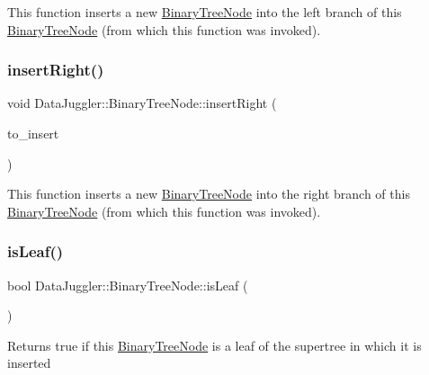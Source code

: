 This function inserts a new \hyperlink{classDataJuggler_1_1BinaryTreeNode}{Binary\+Tree\+Node} into the left branch of this \hyperlink{classDataJuggler_1_1BinaryTreeNode}{Binary\+Tree\+Node} (from which this function was invoked). \mbox{\label{classDataJuggler_1_1BinaryTreeNode_ac59067ab56902eafb5b7c541276c294c}} 
\subsubsection{\texorpdfstring{insert\+Right()}{insertRight()}}
{\footnotesize\ttfamily void Data\+Juggler\+::\+Binary\+Tree\+Node\+::insert\+Right (\begin{DoxyParamCaption}\item[{\hyperlink{classDataJuggler_1_1BinaryTreeNode}{Binary\+Tree\+Node} $\ast$}]{to\+\_\+insert }\end{DoxyParamCaption})}

This function inserts a new \hyperlink{classDataJuggler_1_1BinaryTreeNode}{Binary\+Tree\+Node} into the right branch of this \hyperlink{classDataJuggler_1_1BinaryTreeNode}{Binary\+Tree\+Node} (from which this function was invoked). \mbox{\label{classDataJuggler_1_1BinaryTreeNode_a6716143fcaf85866773b85f3342114d9}} 
\subsubsection{\texorpdfstring{is\+Leaf()}{isLeaf()}}
{\footnotesize\ttfamily bool Data\+Juggler\+::\+Binary\+Tree\+Node\+::is\+Leaf (\begin{DoxyParamCaption}{ }\end{DoxyParamCaption})}

Returns true if this \hyperlink{classDataJuggler_1_1BinaryTreeNode}{Binary\+Tree\+Node} is a leaf of the supertree in which it is inserted \mbox{\label{classDataJuggler_1_1BinaryTreeNode_a2ca8921083f09fdc947bfc8be1af834a}} 
